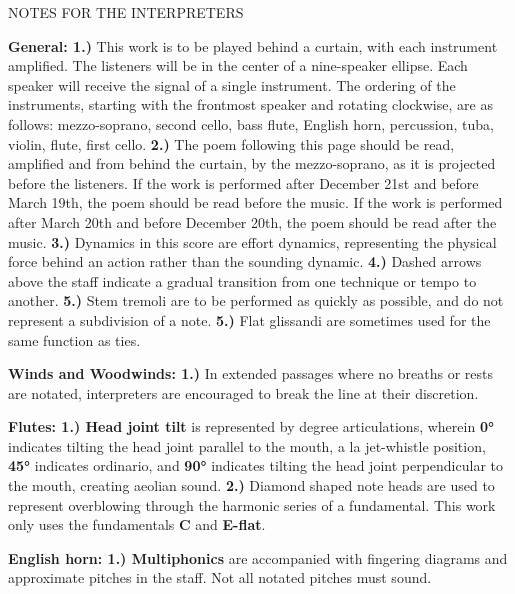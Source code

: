 \documentclass[11pt]{article}
\begin{document}
\vspace*{4\baselineskip}

\begingroup
\begin{center}
\huge NOTES FOR THE INTERPRETERS
\end{center}
\endgroup

\begingroup
\textbf{General: 1.)} This work is to be played behind a curtain, with each instrument amplified. The listeners will be in the center of a nine-speaker ellipse. Each speaker will receive the signal of a single instrument. The ordering of the instruments, starting with the frontmost speaker and rotating clockwise, are as follows: mezzo-soprano, second cello, bass flute, English horn, percussion, tuba, violin, flute, first cello. \textbf{2.)} The poem following this page should be read, amplified and from behind the curtain, by the mezzo-soprano, as it is projected before the listeners. If the work is performed after December 21st and before March 19th, the poem should be read before the music. If the work is performed after March 20th and before December 20th, the poem should be read after the music. \textbf{3.)}  Dynamics in this score are effort dynamics, representing the physical force behind an action rather than the sounding dynamic. \textbf{4.)} Dashed arrows above the staff indicate a gradual transition from one technique or tempo to another. \textbf{5.)}  Stem tremoli are to be performed as quickly as possible, and do not represent a subdivision of a note. \textbf{5.)} Flat glissandi are sometimes used for the same function as ties.
\endgroup

\begingroup
\textbf{Winds and Woodwinds: 1.)} In extended passages where no breaths or rests are notated, interpreters are encouraged to break the line at their discretion.
\endgroup

\begingroup
\textbf{Flutes: 1.) Head joint tilt} is represented by degree articulations, wherein \textbf{0°} indicates tilting the head joint parallel to the mouth, a la jet-whistle position, \textbf{45°} indicates ordinario, and \textbf{90°} indicates tilting the head joint perpendicular to the mouth, creating aeolian sound. \textbf{2.)} Diamond shaped note heads are used to represent overblowing through the harmonic series of a fundamental. This work only uses the fundamentals \textbf{C} and \textbf{E-flat}.
\endgroup

\begingroup
\textbf{English horn: 1.) Multiphonics} are accompanied with fingering diagrams and approximate pitches in the staff. Not all notated pitches must sound.
\endgroup
\end{document}
